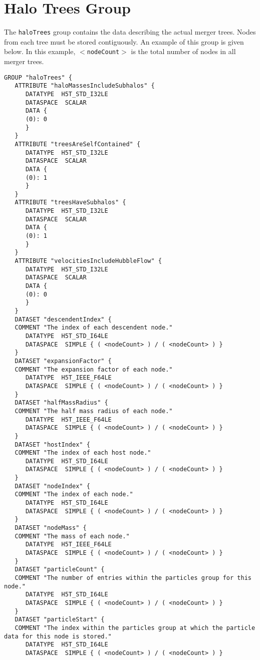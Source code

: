 \section{Halo Trees Group}\label{sec:HaloTreesGroup}

The {\tt haloTrees} group contains the data describing the actual merger trees. Nodes from each tree must be stored contiguously. An example of this group is given below. In this example, {\tt $<$nodeCount$>$} is the total number of nodes in all merger trees.

\begin{verbatim}
GROUP "haloTrees" {
   ATTRIBUTE "haloMassesIncludeSubhalos" {
      DATATYPE  H5T_STD_I32LE
      DATASPACE  SCALAR
      DATA {
      (0): 0
      }
   }
   ATTRIBUTE "treesAreSelfContained" {
      DATATYPE  H5T_STD_I32LE
      DATASPACE  SCALAR
      DATA {
      (0): 1
      }
   }
   ATTRIBUTE "treesHaveSubhalos" {
      DATATYPE  H5T_STD_I32LE
      DATASPACE  SCALAR
      DATA {
      (0): 1
      }
   }
   ATTRIBUTE "velocitiesIncludeHubbleFlow" {
      DATATYPE  H5T_STD_I32LE
      DATASPACE  SCALAR
      DATA {
      (0): 0
      }
   }
   DATASET "descendentIndex" {
   COMMENT "The index of each descendent node."
      DATATYPE  H5T_STD_I64LE
      DATASPACE  SIMPLE { ( <nodeCount> ) / ( <nodeCount> ) }
   }
   DATASET "expansionFactor" {
   COMMENT "The expansion factor of each node."
      DATATYPE  H5T_IEEE_F64LE
      DATASPACE  SIMPLE { ( <nodeCount> ) / ( <nodeCount> ) }
   }
   DATASET "halfMassRadius" {
   COMMENT "The half mass radius of each node."
      DATATYPE  H5T_IEEE_F64LE
      DATASPACE  SIMPLE { ( <nodeCount> ) / ( <nodeCount> ) }
   }
   DATASET "hostIndex" {
   COMMENT "The index of each host node."
      DATATYPE  H5T_STD_I64LE
      DATASPACE  SIMPLE { ( <nodeCount> ) / ( <nodeCount> ) }
   }
   DATASET "nodeIndex" {
   COMMENT "The index of each node."
      DATATYPE  H5T_STD_I64LE
      DATASPACE  SIMPLE { ( <nodeCount> ) / ( <nodeCount> ) }
   }
   DATASET "nodeMass" {
   COMMENT "The mass of each node."
      DATATYPE  H5T_IEEE_F64LE
      DATASPACE  SIMPLE { ( <nodeCount> ) / ( <nodeCount> ) }
   }
   DATASET "particleCount" {
   COMMENT "The number of entries within the particles group for this node."
      DATATYPE  H5T_STD_I64LE
      DATASPACE  SIMPLE { ( <nodeCount> ) / ( <nodeCount> ) }
   }
   DATASET "particleStart" {
   COMMENT "The index within the particles group at which the particle data for this node is stored."
      DATATYPE  H5T_STD_I64LE
      DATASPACE  SIMPLE { ( <nodeCount> ) / ( <nodeCount> ) }

\end{verbatim}
